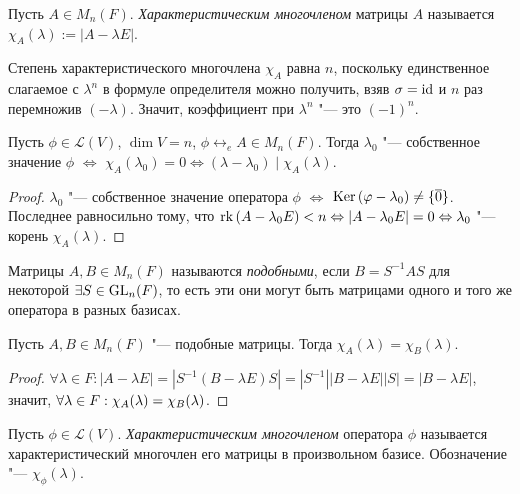 \begin{definition}
	Пусть $A \in M_n(F)$. \textit{Характеристическим многочленом} матрицы $A$ называется $\chi_A(\lambda) := |A - \lambda E|$.
\end{definition}

\begin{note}
	Степень характеристического многочлена $\chi_A$ равна $n$, поскольку единственное слагаемое с $\lambda^n$ в формуле определителя можно получить, взяв $\sigma = \operatorname{id}$ и $n$ раз перемножив $(-\lambda)$. Значит, коэффициент при $\lambda^n$ "--- это $(-1)^n$.
\end{note}

\begin{proposition}
	Пусть $\phi \in \mathcal{L}(V)$, $\dim{V} = n$, $\phi \leftrightarrow_e A \in M_n(F)$. Тогда $\lambda_0$ "--- собственное значение $\phi$ $\Leftrightarrow$ $\chi_A(\lambda_0) = 0 \Leftrightarrow (\lambda - \lambda_0)\mid \chi_A(\lambda)$.
\end{proposition}

\begin{proof}
	$\lambda_0$ "--- собственное значение оператора $\phi$ $\Leftrightarrow$ $\operatorname{Ker}{(\varphi - \lambda_0)} \ne \{\overline{0}\}$. Последнее равносильно тому, что $\rk{(A - \lambda_0 E)} < n \hm{\Leftrightarrow} |A - \lambda_0 E| = 0 \hm{\Leftrightarrow} \lambda_0$ "--- корень $\chi_A(\lambda)$.
\end{proof}

\begin{definition}
	Матрицы $A, B \in M_n(F)$ называются \textit{подобными}, если $B = S^{-1}AS$ для некоторой $\exists S \in \operatorname{GL}_n(F)$, то есть эти они могут быть матрицами одного и того же оператора в разных базисах.
\end{definition}

\begin{proposition}
	Пусть $A, B \in M_n(F)$ "--- подобные матрицы. Тогда $\chi_A(\lambda) = \chi_B(\lambda)$.
\end{proposition}

\begin{proof}
	$\forall \lambda \in F: |A - \lambda E| = |S^{-1}(B - \lambda E)S| = |S^{-1}||B - \lambda E||S| = |B - \lambda E|$, значит, $\forall \lambda \in F: \chi_A(\lambda) \hm{=} \chi_B(\lambda)$.
\end{proof}

\begin{definition}
	Пусть $\phi \in \mathcal{L}(V)$. \textit{Характеристическим многочленом} оператора $\phi$ называется характеристический многочлен его матрицы в произвольном базисе. Обозначение "--- $\chi_\phi(\lambda)$.
\end{definition}

